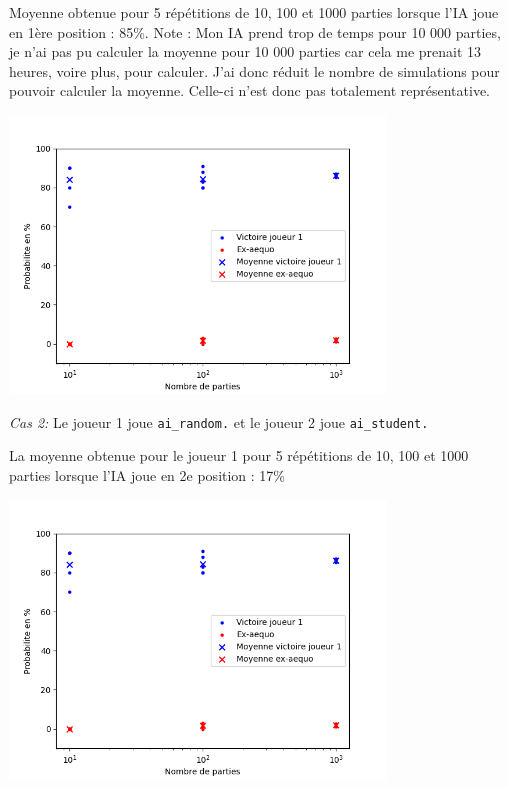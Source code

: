 \documentclass[11pt,answers]{exam}
\begin{document}
\begin{solutionbox}{125mm}
Moyenne obtenue pour 5 répétitions de 10, 100 et 1000 parties lorsque l'IA joue en 1ère position : 85\%.
\newline
Note : Mon IA prend trop de temps pour 10 000 parties, je n'ai pas pu calculer la moyenne pour 10 000 parties car cela me prenait 13 heures, voire plus, pour calculer. J'ai donc réduit le nombre de simulations pour pouvoir calculer la moyenne. Celle-ci n'est donc pas totalement représentative.

\centering
\includegraphics[width=0.75\textwidth]{ai_student_player=1_N=5.png}
\end{solutionbox}

\medskip
\newpage
\emph{Cas 2:} Le joueur 1 joue \texttt{ai\_random.} et le joueur 2 joue \texttt{ai\_student.}

\begin{solutionbox}{110mm}
La moyenne obtenue pour le joueur 1 pour 5 répétitions de 10, 100 et 1000 parties lorsque l'IA joue en 2e 
position : 17\% 

\centering
\includegraphics[width=0.75\textwidth]{ai_student_player=1_N=5.png}
\end{solutionbox}
\end{document}
